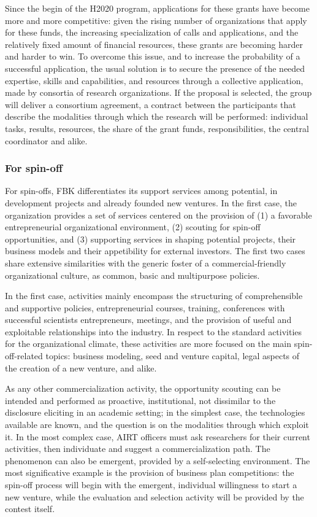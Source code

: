 Since the begin of the H2020 program, applications for these grants have become more and more competitive: given the rising number of organizations that apply for these funds, the increasing specialization of calls and applications, and the relatively fixed amount of financial resources, these grants are becoming harder and harder to win. To overcome this issue, and to increase the probability of a successful application, the usual solution is to secure the presence of the needed expertise, skills and capabilities, and resources through a collective application, made by consortia of research organizations. If the proposal is selected, the group will deliver a consortium agreement, a contract between the participants that describe the modalities through which the research will be performed: individual tasks, results, resources, the share of the grant funds, responsibilities, the central coordinator and alike. 

\subsubsection{For spin-off}

For spin-offs, FBK differentiates its support services among potential, in development projects and already founded new ventures. In the first case, the organization provides a set of services centered on the provision of (1) a favorable entrepreneurial organizational environment, (2) scouting for spin-off opportunities, and (3) supporting services in shaping potential projects, their business models and their appetibility for external investors. The first two cases share extensive similarities with the generic foster of a commercial-friendly organizational culture, as common, basic and multipurpose policies.

In the first case, activities mainly encompass the structuring of comprehensible and supportive policies,  entrepreneurial courses, training, conferences with successful scientists entrepreneurs, meetings, and the provision of useful and exploitable relationships into the industry. In respect to the standard activities for the organizational climate, these activities are more focused on the main spin-off-related topics: business modeling, seed and venture capital, legal aspects of the creation of a new venture, and alike. 

As any other commercialization activity, the opportunity scouting can be intended and performed as proactive, institutional, not dissimilar to the disclosure eliciting in an academic setting; in the simplest case, the technologies available are known, and the question is on the modalities through which exploit it. In the most complex case, AIRT officers must ask researchers for their current activities, then individuate and suggest a commercialization path. The phenomenon can also be emergent, provided by a self-selecting environment. The most significative example is the provision of business plan competitions: the spin-off process will begin with the emergent, individual willingness to start a new venture, while the evaluation and selection activity will be provided by the contest itself.

